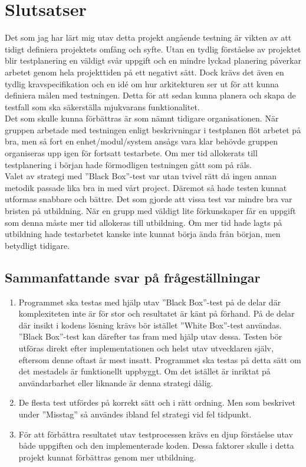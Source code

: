 \section{Slutsatser}
	Det som jag har lärt mig utav detta projekt angående testning är vikten av att tidigt definiera projektets omfång och syfte. Utan en tydlig förståelse av projektet blir testplanering en väldigt svår uppgift och en mindre lyckad planering påverkar arbetet genom hela projekttiden på ett negativt sätt. Dock krävs det även en tydlig kravspecifikation och en idé om hur arkitekturen ser ut för att kunna definiera målen med testningen. Detta för att sedan kunna planera och skapa de testfall som ska säkerställa mjukvarans funktionalitet. \\
Det som skulle kunna förbättras är som nämnt tidigare organisationen. När gruppen arbetade med testningen enligt beskrivningar i testplanen flöt arbetet på bra, men så fort en enhet/modul/system ansågs vara klar behövde gruppen organiseras upp igen för fortsatt testarbete. Om mer tid allokerats till testplanering i början hade förmodligen testningen gått som på räls. \\
Valet av strategi med ''Black Box''-test var utan tvivel rätt då ingen annan metodik passade lika bra in med vårt project. Däremot så hade testen kunnat utformas snabbare och bättre. Det som gjorde att vissa test var mindre bra var bristen på utbildning. När en grupp med väldigt lite förkunskaper får en uppgift som denna måste mer tid allokeras till utbildning. Om mer tid hade lagts på utbildning hade testarbetet kanske inte kunnat börja ända från början, men betydligt tidigare.
	
\subsection{Sammanfattande svar på frågeställningar}
	\begin{enumerate}
	\item Programmet ska testas med hjälp utav ''Black Box''-test på de delar där komplexiteten inte är för stor och resultatet är känt på förhand. På de delar där insikt i kodens lösning krävs bör istället ''White Box''-test användas. ''Black Box''-test kan därefter tas fram med hjälp utav dessa. Testen bör utföras direkt efter implementationen och helst utav utvecklaren själv, eftersom denne oftast är mest insatt. Programmet ska testas på detta sätt om det mestadels är funktionellt uppbyggt. Om det istället är inriktat på användarbarhet eller liknande är denna strategi dålig.
	\item De flesta test utfördes på korrekt sätt och i rätt ordning. Men som beskrivet under ''Misstag'' så användes ibland fel strategi vid fel tidpunkt.
	\item För att förbättra resultatet utav testprocessen krävs en djup förståelse utav både uppgiften och den implementerade koden. Dessa faktorer skulle i detta projekt kunnat förbättras genom mer utbildning.
	\end{enumerate}
	
